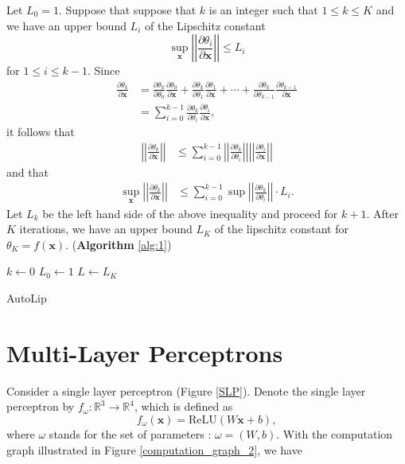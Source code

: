 \documentclass[12pt]{report}
\numberwithin{figure}{chapter}
\theoremstyle{plain}
\theoremstyle{definition}
\theoremstyle{corollary}
\theoremstyle{definition}
\theoremstyle{plain}
\theoremstyle{definition}
\theoremstyle{plain}
\newcommand\bx{\ensuremath{\boldsymbol x}}
\newcommand\lip{\ensuremath{\text{Lip}}}
\begin{document}
Let \(L_0=1\).
Suppose that suppose that \(k\) is an integer such that \(1\le k\le K\) and we have an upper bound \(L_i\) of the Lipschitz constant
\[\sup_{\boldsymbol x}\left|\left|\frac{\partial\theta_i}{\partial\boldsymbol x}\right|\right|\le L_i\]
for \(1\le i\le k-1\).
Since
\begin{align*}
\frac{\partial \theta_k}{\partial\boldsymbol x}
&=\frac{\partial\theta_k}{\partial\theta_0}\frac{\partial\theta_0}{\partial\boldsymbol x}
+\frac{\partial\theta_k}{\partial\theta_1}\frac{\partial\theta_1}{\partial\boldsymbol x}
+\cdots
+\frac{\partial\theta_k}{\partial\theta_{k-1}}\frac{\partial\theta_{k-1}}{\partial\boldsymbol x}\\
&=\sum_{i=0}^{k-1}\frac{\partial\theta_k}{\partial\theta_i}\frac{\partial\theta_i}{\partial\boldsymbol x},
\end{align*}
it follows that
\begin{align*}
\left|\left|\frac{\partial \theta_k}{\partial\boldsymbol x}\right|\right|
&\le\sum_{i=0}^{k-1}
\left|\left|\frac{\partial\theta_k}{\partial\theta_i}\right|\right|
\left|\left|\frac{\partial\theta_i}{\partial\boldsymbol x}\right|\right|
\end{align*}
and that
\begin{align*}
\sup_{\boldsymbol x}\left|\left|\frac{\partial \theta_k}{\partial\boldsymbol x}\right|\right|
&\le\sum_{i=0}^{k-1}
\sup\left|\left|\frac{\partial\theta_k}{\partial\theta_i}\right|\right|\cdot L_i.
\end{align*}
Let \(L_k\) be the left hand side of the above inequality and proceed for \(k+1\).
After \(K\) iterations, we have an upper bound \(L_K\) of the lipschitz constant for \(\theta_K=f(\boldsymbol x)\).
(\textbf{Algorithm} \ref{alg:1})

\begin{algorithm}
\KwResult{An upper bound \(L\) for \(\lip(f)\)}
\(k\gets 0\)\;
\(L_0\gets1\)\;
\(L\gets L_K\)
\caption{AutoLip}
\label{alg:1}
\end{algorithm}


\section{Multi-Layer Perceptrons}
Consider a single layer perceptron (Figure \ref{SLP}).
Denote the single layer perceptron by \(f_\omega:\mathbb R^3\to\mathbb R^4\), which is defined as
\[f_\omega(\bx)=\text{ReLU}(W\bx+b),\]
where \(\omega\) stands for the set of parameters : \(\omega=(W,b)\).
With the computation graph illustrated in Figure \ref{computation_graph_2}, we have
\end{document}
